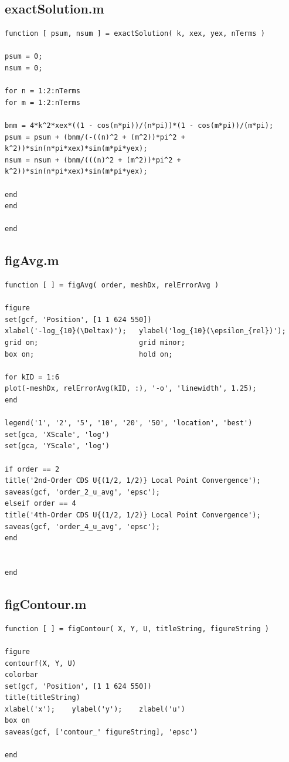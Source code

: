 \documentclass[10pt]{article}		%
\numberwithin{equation}{section}
\begin{document}
\subsection{exactSolution.m}

\begin{lstlisting}
function [ psum, nsum ] = exactSolution( k, xex, yex, nTerms )

psum = 0;
nsum = 0;

for n = 1:2:nTerms
for m = 1:2:nTerms

bnm = 4*k^2*xex*((1 - cos(n*pi))/(n*pi))*(1 - cos(m*pi))/(m*pi);        
psum = psum + (bnm/(-((n)^2 + (m^2))*pi^2 + k^2))*sin(n*pi*xex)*sin(m*pi*yex);
nsum = nsum + (bnm/(((n)^2 + (m^2))*pi^2 + k^2))*sin(n*pi*xex)*sin(m*pi*yex);

end
end

end
\end{lstlisting}

\subsection{figAvg.m}

\begin{lstlisting}
function [ ] = figAvg( order, meshDx, relErrorAvg )

figure
set(gcf, 'Position', [1 1 624 550])
xlabel('-log_{10}(\Deltax)');   ylabel('log_{10}(\epsilon_{rel})');
grid on;                        grid minor;
box on;                         hold on;

for kID = 1:6
plot(-meshDx, relErrorAvg(kID, :), '-o', 'linewidth', 1.25);
end

legend('1', '2', '5', '10', '20', '50', 'location', 'best')
set(gca, 'XScale', 'log')
set(gca, 'YScale', 'log')

if order == 2
title('2nd-Order CDS U{(1/2, 1/2)} Local Point Convergence');
saveas(gcf, 'order_2_u_avg', 'epsc');
elseif order == 4
title('4th-Order CDS U{(1/2, 1/2)} Local Point Convergence');
saveas(gcf, 'order_4_u_avg', 'epsc');
end


end
\end{lstlisting}

\subsection{figContour.m}

\begin{lstlisting}
function [ ] = figContour( X, Y, U, titleString, figureString )

figure
contourf(X, Y, U)
colorbar
set(gcf, 'Position', [1 1 624 550])
title(titleString)
xlabel('x');    ylabel('y');    zlabel('u')
box on
saveas(gcf, ['contour_' figureString], 'epsc')

end
\end{lstlisting}
\end{document}
